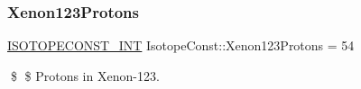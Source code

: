\subsubsection{\texorpdfstring{Xenon123\+Protons}{Xenon123Protons}}
{\footnotesize\ttfamily \mbox{\hyperlink{group___isotope_const-_macros_ga5f18360b3e99483a35c32d789e62621c}{I\+S\+O\+T\+O\+P\+E\+C\+O\+N\+S\+T\+\_\+\+I\+NT}} Isotope\+Const\+::\+Xenon123\+Protons = 54}

\$ \$ Protons in Xenon-\/123. 